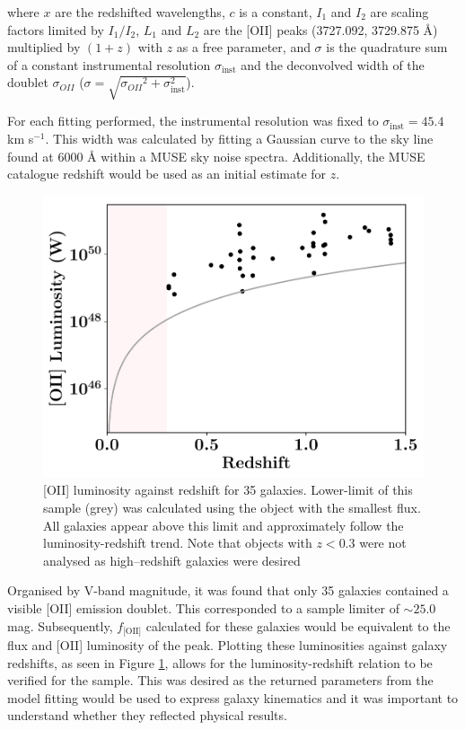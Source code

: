 \documentclass[12pt, twocolumn, nofootinbib]{revtex4-1}    %
\begin{document}
where $x$ are the redshifted wavelengths, ${c}$ is a constant, ${I_1}$ and ${I_2}$ are scaling factors limited by $I_1/I_2$, $L_1$ and $L_2$ are the [OII] peaks (3727.092, 3729.875 {\AA}) multiplied by $(1+{z})$ with $z$ as a free parameter, and $\sigma$ is the quadrature sum of a constant instrumental resolution $\sigma_{\text{inst}}$ and the deconvolved width of the doublet $\sigma_{OII}$ ($\sigma=\sqrt{{\sigma_{OII}}^2 + \sigma_{\text{inst}}^2}$).

For each fitting performed, the instrumental resolution was fixed to $\sigma_{\text{inst}}=45.4$ km s$^{-1}$. This width was calculated by fitting a Gaussian curve to the sky line found at 6000 {\AA} within a MUSE sky noise spectra. Additionally, the MUSE catalogue redshift would be used as an initial estimate for $z$.

\begin{figure}
\includegraphics[width=1.0\linewidth]{data/o_ii_luminosity_vs_redshift}
\caption{[OII] luminosity against redshift for 35 galaxies. Lower-limit of this sample (grey) was calculated using the object with the smallest flux. All galaxies appear above this limit and approximately follow the luminosity-redshift trend. Note that objects with $z<0.3$ were not analysed as high--redshift galaxies were desired}
\label{fig:oiiluminosity_redshift}
\end{figure} 

Organised by V-band magnitude, it was found that only 35 galaxies contained a visible [OII] emission doublet. This corresponded to a sample limiter of $\sim25.0$ mag. Subsequently, $f_{\text{[OII]}}$ calculated for these galaxies would be equivalent to the flux and [OII] luminosity of the peak. Plotting these luminosities against galaxy redshifts, as seen in Figure \ref{fig:oiiluminosity_redshift}, allows for the luminosity-redshift relation to be verified for the sample. This was desired as the returned parameters from the model fitting would be used to express galaxy kinematics and it was important to understand whether they reflected physical results. 
\end{document}
